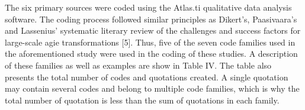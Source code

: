The six primary sources were coded using the Atlas.ti qualitative data
analysis software. The coding process followed similar principles as
Dikert's, Paasivaara's and Lassenius' systematic literary review of the
challenges and success factors for large-scale agie transformations
[5]. Thus, five of the seven code families used in the aforementioned
study were used in the coding of these studies. A description of
these families as well as examples are show in Table IV. The table
also presents the total number of codes and quotations created. A
single quotation may contain several codes and belong to multiple code
families, which is why the total number of quotation is less than the
sum of quotations in each family.
